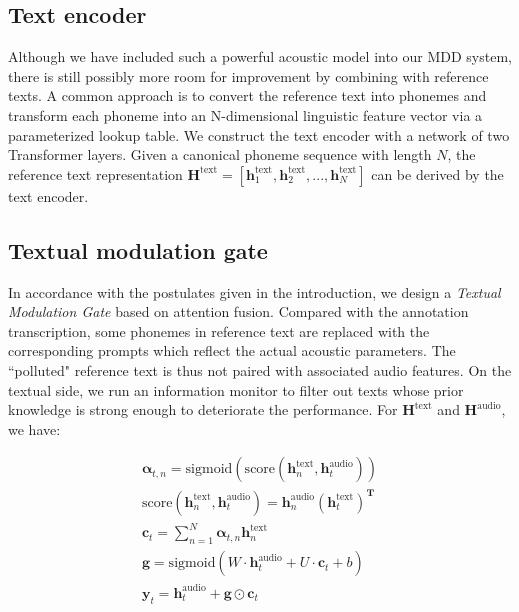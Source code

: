 \documentclass[a4paper]{article}
\begin{document}
\subsection{Text encoder}

Although we have included such a powerful acoustic model into our MDD system, there is still possibly more room for improvement by combining with reference texts. A common approach is to convert the reference text into phonemes and transform each phoneme into an N-dimensional linguistic feature vector via a parameterized lookup table. We construct the text encoder with a network of two Transformer layers. Given a canonical phoneme sequence with length $N$, the reference text representation $\mathbf{H}^{\mathrm{text}}=[\mathbf{h}^{\mathrm{text}}_1,\mathbf{h}^{\mathrm{text}}_2,...,\mathbf{h}^{\mathrm{text}}_N]$ can be derived by the text encoder.


\subsection{Textual modulation gate}\label{sec:gate}
In accordance with the postulates given in the introduction, we design a \emph{Textual Modulation Gate} based on attention fusion. Compared with the annotation transcription, some phonemes in reference text are replaced with the corresponding prompts which reflect the actual acoustic parameters. The ``polluted" reference text is thus not paired with associated audio features. On the textual side, we run an information monitor to filter out texts whose prior knowledge is strong enough to deteriorate the performance. For $\mathbf{H}^{\mathrm{text}}$ and $\mathbf{H}^{\mathrm{audio}}$, we have:

\begin{gather}
\mathbf{\alpha}_{t,n} = \mathrm{sigmoid}(\mathrm{score}(\mathbf{h}^{\mathrm{text}}_n, \mathbf{h}^{\mathrm{audio}}_t)) \\
\mathrm{score}(\mathbf{h}^{\mathrm{text}}_n, \mathbf{h}^{\mathrm{audio}}_t) = \mathbf{h}^{\mathrm{audio}}_n (\mathbf{h}^{\mathrm{text}}_t)^{\mathbf{T}} \\ %
\mathbf{c}_t = \sum^N_{n=1} \mathbf{\alpha}_{t,n}\mathbf{h}^{\mathrm{text}}_n \\ %
\mathbf{g} = \mathrm{sigmoid}(W\cdot \mathbf{h}^{\mathrm{audio}}_t  + U \cdot \mathbf{c}_t + b) \\ 
\mathbf{y}_t = \mathbf{h}^{\mathrm{audio}}_t + \mathbf{g} \odot \mathbf{c}_t
\end{gather}
\end{document}
